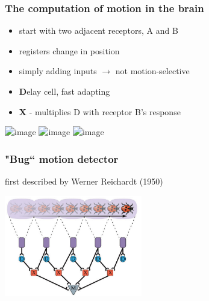 \documentclass[]{beamer}
\begin{document}
\begin{frame}
\frametitle{The computation of motion in the brain}
\begin{overlayarea}{110mm}{80mm}
\begin{itemize}
 \item<1-> start with two adjacent receptors, A and B
 \item<2->[$\rightarrow$] registers change in position
 \item<3-> simply adding inputs $\rightarrow$ not motion-selective
 \item<4-> \textbf{D}elay cell, fast adapting 
 \item<5-> \textbf{X} - multiplies D with receptor B's response
\end{itemize}

 \begin{center}
\includegraphics<1-2>[width=70mm]{figs/l7/reichardt_detector_2cells_1.png}
\includegraphics<3>[width=70mm]{figs/l7/reichardt_detector_2cells_0.png}
\includegraphics<4->[width=70mm]{figs/l7/reichardt_detector_2cells.png}
 \end{center}
\end{overlayarea}
\end{frame}


\begin{frame}
 \frametitle{"Bug`` motion detector}
\begin{overlayarea}{130mm}{70mm}
first described by Werner Reichardt (1950)
 \begin{center}
\includegraphics[width=60mm]{figs/l7/reichardt_detector_manycells.png}
 \end{center}
\end{overlayarea}
\end{frame}
\end{document}
